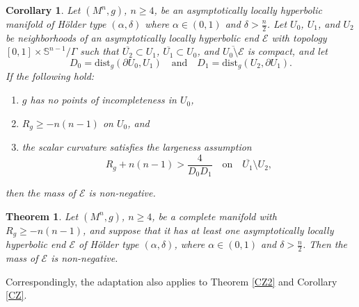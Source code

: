 \documentclass[11pt]{amsart}
\newcommand{\dist}{\mathrm{dist}}
\newtheorem{thm}{Theorem}[section]
\newtheorem{cor}{Corollary}[section]
\theoremstyle{remark}
\numberwithin{equation}{section}
\def\a{{\alpha}}
\def\d{\frac {\operatorname d}{\operatorname {dt}}}
\def\d{\delta}
\begin{document}
{{\begin{cor}\label{QSTALH} 
Let $(M^n,g)$, $n\ge 4$, be an asymptotically locally hyperbolic manifold of H\"older type $(\a,\d)$ where $\a\in(0,1)$ and $\delta>\frac{n}{2}$. Let $U_0$, $U_1$, and $U_2$ be neighborhoods of an asymptotically locally hyperbolic end $\mathcal E$ with topology $[0,1]\times \mathbb{S}^{n-1}/\Gamma$ such that  $\overline{U_2}\subset U_1$, $\overline{U_1}\subset U_0$, and $\overline {U_0 \setminus \mathcal E}$ is compact,
and let 
$$D_0=\dist_g(\partial U_0, U_1)\quad\text{and}\quad
D_1 =\dist_g(U_2,\partial U_1).$$
If the following hold:
\begin{enumerate}
    \item $g$ has no points of incompleteness in $U_0$, 
    
    \item $R_g\ge -n(n-1)$ on $U_0$, and 
    
    \item \label{scalar_boundALH} the scalar curvature satisfies the largeness assumption 
    \begin{equation}\label{largenessALH}
R_g+n(n-1)>\frac{4}{D_0 D_1}\quad \text{on}\quad\overline{U_1}\setminus U_2,
    \end{equation}
\end{enumerate}
then the mass of $\mathcal E$ is non-negative. 
\end{cor}

\begin{thm}\label{mainALH}
Let $(M^n,g)$, $n \ge 4$, be a complete manifold with $R_g\geq -n(n-1)$, and suppose that it has at least one asymptotically locally hyperbolic end $\mathcal E$ of H\"older type $(\a,\d)$, where $\a\in(0,1)$ and $\delta>\frac{n}{2}$. Then the mass of $\mathcal E$ is non-negative. 
\end{thm}

Correspondingly, the adaptation also applies to Theorem \ref{CZ2} and Corollary \ref{CZ}. 



\appendix
}}
\end{document}
